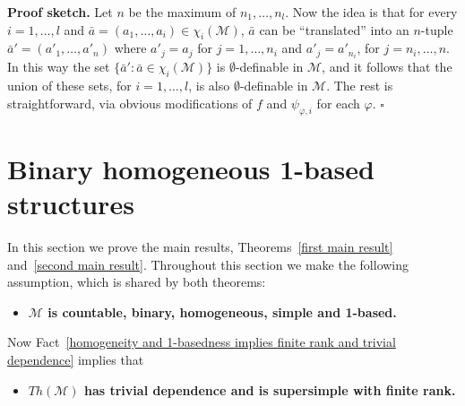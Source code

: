 \documentclass[11pt, twoside]{amsart}
\numberwithin{equation}{section}
\newcommand{\es}{\emptyset}
\newcommand{\mcM}{\mathcal{M}}
\begin{document}
\noindent
{\bf Proof sketch.}
Let $n$ be the maximum of $n_1, \ldots, n_l$.
Now the idea is that for every $i = 1, \ldots, l$ and $\bar{a} = (a_1, \ldots, a_i) \in \chi_i(\mcM)$, 
$\bar{a}$ can be ``translated'' into an $n$-tuple $\bar{a}' = (a'_1, \ldots, a'_n)$ where $a'_j = a_j$ for $j = 1, \ldots, n_i$
and $a'_j = a'_{n_i}$, for $j = n_i, \ldots, n$. In this way the set 
$\{ \bar{a}' : \bar{a} \in \chi_i(\mcM) \}$
is $\es$-definable in $\mcM$, and it follows that the union of these sets, for $i = 1, \ldots, l$, is also $\es$-definable in $\mcM$.
The rest is straightforward, via obvious modifications of $f$ and $\psi_{\varphi,i}$ for each $\varphi$.
\hfill $\square$


































\section{Binary homogeneous 1-based structures}
\label{Binary homogeneous 1-based structures}


\noindent
In this section we prove the main results, Theorems~\ref{first main result} and~\ref{second main result}.
Throughout this section we make the following assumption, which is shared by both theorems:

\begin{itemize}
\item[]
{\bf $\mcM$ is countable, binary, homogeneous, simple and 1-based.}
\end{itemize}

\noindent
Now Fact~\ref{homogeneity and 1-basedness implies finite rank and trivial dependence} implies that

\begin{itemize}
\item[] {\bf $Th(\mcM)$ has trivial dependence and is supersimple with finite rank.}
\end{itemize}
\end{document}
